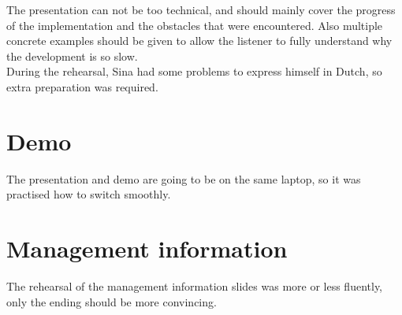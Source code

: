 \documentclass[a4paper, 12pt]{article}
\begin{document}
The presentation can not be too technical, and should mainly cover the progress of the implementation and the obstacles that were encountered. Also multiple concrete examples should be given to allow the listener to fully understand why the development is so slow. \\

During the rehearsal, Sina had some problems to express himself in Dutch, so extra preparation was required. 

\section{Demo}

The presentation and demo are going to be on the same laptop, so it was practised how to switch smoothly. 


\section{Management information}

The rehearsal of the management information slides was more or less fluently, only the ending should be more convincing. 



		
\end{document}
